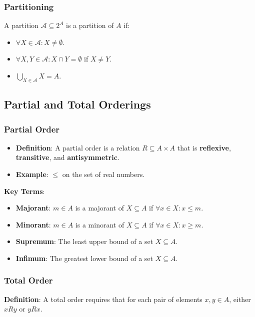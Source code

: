 \subsubsection*{Partitioning}
A partition $\mathscr{A} \subseteq 2^A$ is a partition of $A$ if:
\begin{itemize}
    \item $\forall X \in \mathscr{A}: X \neq \emptyset$.
    \item $\forall X, Y \in \mathscr{A}: X \cap Y = \emptyset$ if $X \neq Y$.
    \item $\bigcup_{X \in \mathscr{A}} X = A$.
\end{itemize}

\subsection{Partial and Total Orderings}

\subsubsection*{Partial Order}
\begin{itemize}
    \item \textbf{Definition}: A partial order is a relation $R \subseteq A \times A$ that is \textbf{reflexive}, \textbf{transitive}, and \textbf{antisymmetric}.
    \item \textbf{Example}: $\leq$ on the set of real numbers.
\end{itemize}

\textbf{Key Terms}:
\begin{itemize}

    \item \textbf{Majorant}: $m \in A$ is a majorant of $X \subseteq A$ if $\forall x \in X: x \leq m$.
    \item \textbf{Minorant}: $m \in A$ is a minorant of $X \subseteq A$ if $\forall x \in X: x \geq m$.
    \item \textbf{Supremum}: The least upper bound of a set $X \subseteq A$.
    \item \textbf{Infimum}: The greatest lower bound of a set $X \subseteq A$.
\end{itemize}

\subsubsection*{Total Order}
\textbf{Definition}: A total order requires that for each pair of elements $x, y \in A$, either $x R y$ or $y R x$.

